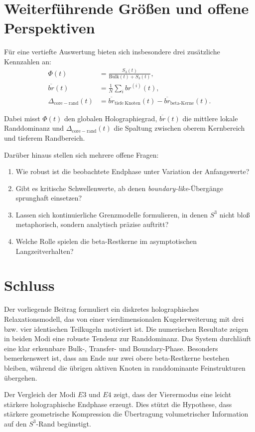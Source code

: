 \documentclass[11pt,a4paper]{article}
\theoremstyle{definition}
\theoremstyle{remark}
\begin{document}
	\section{Weiterführende Größen und offene Perspektiven}
	Für eine vertiefte Auswertung bieten sich insbesondere drei zusätzliche Kennzahlen an:
	\begin{align*}
		\Phi(t) &= \frac{S_3(t)}{\mathrm{Bulk}(t)+S_3(t)},\\
		\overline{br}(t) &= \frac{1}{N}\sum_i br^{(i)}(t),\\
		\Delta_{\mathrm{core-rand}}(t) &= \overline{br}_{\mathrm{tiefe\ Knoten}}(t)-\overline{br}_{\mathrm{beta\text{-}Kerne}}(t).
	\end{align*}
	
	Dabei misst $\Phi(t)$ den globalen Holographiegrad, $\overline{br}(t)$ die mittlere lokale Randdominanz und $\Delta_{\mathrm{core-rand}}(t)$ die Spaltung zwischen oberem Kernbereich und tieferem Randbereich.
	
	Darüber hinaus stellen sich mehrere offene Fragen:
	\begin{enumerate}[leftmargin=2em]
		\item Wie robust ist die beobachtete Endphase unter Variation der Anfangswerte?
		\item Gibt es kritische Schwellenwerte, ab denen \emph{boundary-like}-Übergänge sprunghaft einsetzen?
		\item Lassen sich kontinuierliche Grenzmodelle formulieren, in denen $S^3$ nicht bloß metaphorisch, sondern analytisch präzise auftritt?
		\item Welche Rolle spielen die beta-Restkerne im asymptotischen Langzeitverhalten?
	\end{enumerate}
	
	\section{Schluss}
	Der vorliegende Beitrag formuliert ein diskretes holographisches Relaxationsmodell, das von einer vierdimensionalen Kugelerweiterung mit drei bzw. vier identischen Teilkugeln motiviert ist. Die numerischen Resultate zeigen in beiden Modi eine robuste Tendenz zur Randdominanz. Das System durchläuft eine klar erkennbare Bulk-, Transfer- und Boundary-Phase. Besonders bemerkenswert ist, dass am Ende nur zwei obere beta-Restkerne bestehen bleiben, während die übrigen aktiven Knoten in randdominante Feinstrukturen übergehen.
	
	Der Vergleich der Modi $E3$ und $E4$ zeigt, dass der Vierermodus eine leicht stärkere holographische Endphase erzeugt. Dies stützt die Hypothese, dass stärkere geometrische Kompression die Übertragung volumetrischer Information auf den $S^3$-Rand begünstigt.
	
\end{document}
